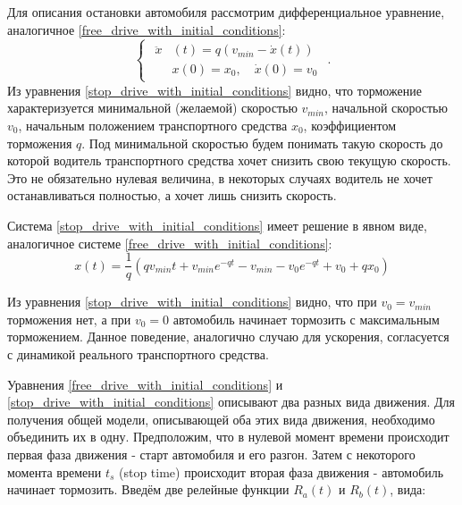 \documentclass[12pt, a4paper]{extarticle}
\numberwithin{equation}{section}
\begin{document}
Для описания остановки автомобиля рассмотрим дифференциальное уравнение, аналогичное \eqref{free_drive_with_initial_conditions}: 
\begin{equation} \label{stop_drive_with_initial_conditions}
\begin{cases}
\begin{split}
\ddot{x}&(t) = q\left( v_{min} - \dot{x}(t)\right) \\
&x(0)=x_0, \quad \dot{x}(0)=v_0
\end{split}
\end{cases}.
\end{equation}
Из уравнения \eqref{stop_drive_with_initial_conditions} видно, что торможение характеризуется минимальной (желаемой) скоростью $v_{min}$, начальной скоростью $v_{0}$, начальным положением транспортного средства $x_0$, коэффициентом торможения $q$. Под минимальной скоростью будем понимать такую скорость до которой водитель транспортного средства хочет снизить свою текущую скорость. Это не обязательно нулевая величина, в некоторых случаях водитель не хочет останавливаться полностью, а хочет лишь снизить скорость.

Система \eqref{stop_drive_with_initial_conditions} имеет решение в явном виде, аналогичное системе \eqref{free_drive_with_initial_conditions}:
\begin{equation*}
x(t) = \dfrac{1}{q}\left(qv_{min}t+v_{min}e^{-qt}-v_{min}-v_0e^{-qt}+v_0+qx_0\right) 
\end{equation*}

Из уравнения \eqref{stop_drive_with_initial_conditions} видно, что при $v_0=v_{min}$ торможения нет, а при $v_0=0$ автомобиль начинает тормозить с максимальным торможением. Данное поведение, аналогично случаю для ускорения, согласуется с динамикой реального транспортного средства.

Уравнения \eqref{free_drive_with_initial_conditions} и  \eqref{stop_drive_with_initial_conditions} описывают два разных вида движения. Для получения общей модели, описывающей оба этих вида движения, необходимо объединить их в одну. Предположим, что в нулевой момент времени происходит первая фаза движения - старт автомобиля и его разгон. Затем с некоторого момента времени $t_s$ (stop time) происходит вторая фаза движения - автомобиль начинает тормозить. Введём две релейные функции $R_{a}(t)$ и $R_{b}(t)$, вида:  
\end{document}
